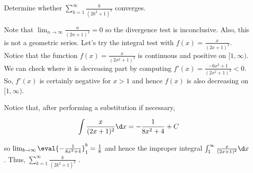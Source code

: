 \documentclass{ximera}
\begin{document}
\begin{example}
Determine whether $\sum_{k=1}^{\infty} \frac{k}{(2k^2+1)^2}$ converges.

\begin{explanation}
Note that $\lim_{n \to \infty}  \frac{n}{(2n+1)^2} =0$ so the divergence test is inconclusive.  Also, this is not a geometric series.  Let's try the integral test with $f(x) =  \frac{x}{(2x+1)^2}$.  Notice that the function $f(x) = \frac{x}{(2x^2+1)^2}$ is continuous and positive on $[1,\infty)$.  We can check where it is decreasing part by computing $f'(x) = \frac{-6x^2+1}{(2x^2+1)^3} < 0$.  So, $f'(x)$ is certainly negative for $x >1$ and hence $f(x)$ is also decreasing on $[1,\infty)$.

Notice that, after performing a substitution if necessary,  

\[
\int \frac{x}{(2x+1)^2} \d x = -\frac{1}{8x^2+4} +C
\]

so $\lim_{b \to \infty} \eval{ -\frac{1}{8x^2+4}}_1^b = \frac{1}{8}$ and hence the improper integral $\int_1^{\infty}  \frac{x}{(2x+1)^2} \d x $ .  Thus,  $\sum_{k=1}^{\infty} \frac{k}{(2k^2+1)^2}$ .

\end{explanation}

\end{example}
\end{document}
